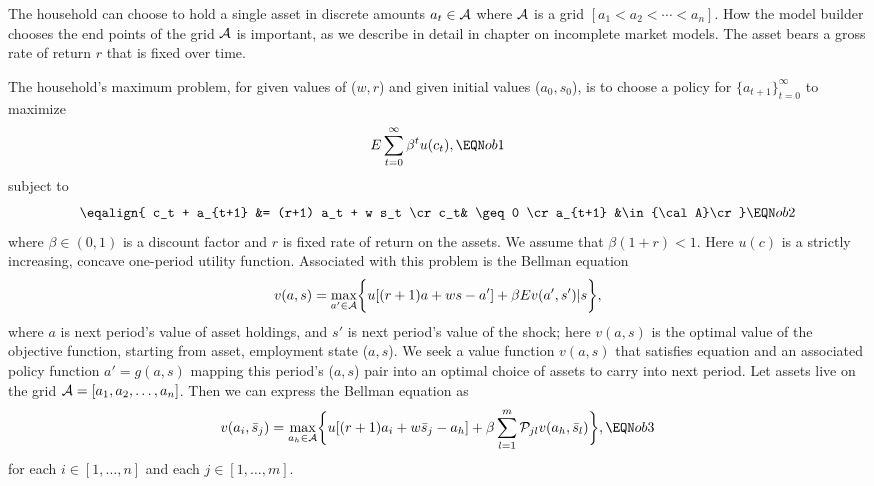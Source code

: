   The household can choose to hold a single asset in
discrete amounts
$a_t \in {\cal A}$ where
${\cal A}$ is a grid
$[a_1 < a_2 < \cdots < a_n]$.
How the model builder chooses the end points of the
grid ${\cal A}$ is important, as we describe in detail
in chapter  on incomplete market models.  The asset bears
a gross rate of return $r$ that is fixed over time.

The household's maximum problem, for given values of ($w,r$)
and given initial values ($a_0, s_0$), is to choose a policy for
 $\{a_{t+1}\}_{t=0}^\infty$ to maximize
$$ E \sum_{t=0}^\infty \beta^t u(c_t)  , \EQN ob1 $$
subject to
$$\eqalign{ c_t + a_{t+1} &= (r+1) a_t + w s_t  \cr
             c_t& \geq 0 \cr
             a_{t+1} &\in {\cal A}\cr }\EQN ob2$$
where
$\beta \in (0,1)$ is a discount factor and $r$ is fixed
rate of return on the assets.  We assume that
$\beta (1+r) < 1$.  Here $u(c)$ is a strictly
increasing, concave one-period utility function.  %
 Associated with
this problem is the Bellman equation
$$ v(a,s) = \max_{a' \in {\cal A}} \biggl\{u[(r+1)a +ws - a'] + \beta
       E v(a',s') \vert s \biggr\} ,$$
       where $a$ is next period's value of asset holdings, and $s'$ is
next period's value of the shock; here $v(a,s)$ is
the optimal value of the objective function, starting
from asset, employment state ($a,s$).  We seek a value function $v(a,s)$ that satisfies equation
 and an associated policy function
$a' = g (a,s)$ mapping this period's ($a,s$) pair into an optimal
choice of assets to carry into next period.
Let assets live on the grid ${\cal A} = [a_1, a_2, \ldots, a_n]$. Then we can  express the Bellman equation as
$$ v(a_i, \bar s_j) = \max_{a_h \in {\cal A}} \biggl\{u[(r+1)a_i+w \bar s_j - a_h]
 + \beta  \sum_{l=1}^m {\cal P}_{j l} v(a_h,\bar s_l)\biggr\} ,\EQN ob3$$
for each $i \in [1, \ldots, n]$ and each $j \in [1, \ldots, m]$.
   


